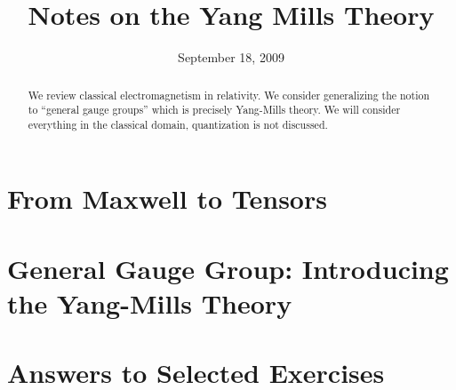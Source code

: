 \documentclass{article}
\title{Notes on the Yang Mills Theory}
\date{September 18, 2009}
\begin{document}
\maketitle
\begin{abstract}
We review classical electromagnetism in relativity. We consider
generalizing the notion to ``general gauge groups'' which is
precisely Yang-Mills theory. We will consider everything in the
classical domain, quantization is not discussed.
\end{abstract}
\tableofcontents

\section{From Maxwell to Tensors}

\pagebreak
\section{General Gauge Group: Introducing the Yang-Mills Theory}

\pagebreak
\section{Answers to Selected Exercises}
\dumpanswers
\pagebreak
\nocite{*}

\end{document}

